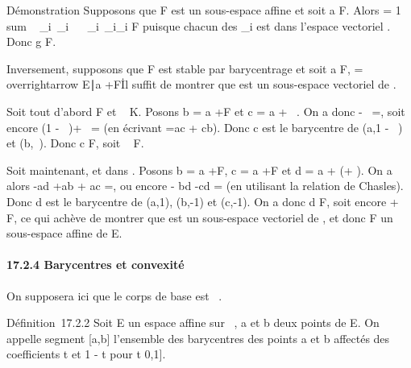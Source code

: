 \documentclass[]{article}
\begin{document}
Démonstration Supposons que F est un sous-espace affine et soit a \in F.
Alors \overrightarrowag = 1 \over
\\sum ~
\_i\inI\lambda~\_i \
\sum ~
\_i\inI\lambda~\_i\overrightarrowaa\_i
\in\overrightarrow F puisque chacun des
\overrightarrowaa\_i est dans l'espace
vectoriel \overrightarrowF. Donc g \in F.

Inversement, supposons que F est stable par barycentrage et soit a \in F,
\overrightarrowF =
\\overrightarrow\xi
\in\overrightarrow E∣a
+\overrightarrow \xi \in F\. Il suffit
de montrer que \overrightarrowF est un sous-espace
vectoriel de \overrightarrowE.

Soit tout d'abord \overrightarrow\xi
\in\overrightarrow F et \lambda~ \in K. Posons b = a
+\overrightarrow \xi \in F et c = a +
\lambda~\overrightarrow\xi. On a donc
\overrightarrowac -
\lambda~\overrightarrowab =, soit encore (1 - \lambda~)\overrightarrowac +
\lambda~\overrightarrowbc = (en écrivant \overrightarrowab
=\overrightarrow ac +\overrightarrow
cb). Donc c est le barycentre de (a,1 - \lambda~) et (b,\lambda~). Donc c \in F, soit
\lambda~\overrightarrow\xi \in\overrightarrow
F.

Soit maintenant, \overrightarrow\xi et
\overrightarrow\eta dans
\overrightarrowF. Posons b = a
+\overrightarrow \xi \in F, c = a
+\overrightarrow \eta \in F et d = a +
(\overrightarrow\xi +\overrightarrow
\eta). On a alors -\overrightarrow ad
+\overrightarrow ab +\overrightarrow
ac =, ou encore
\overrightarrowad -\overrightarrow
bd -\overrightarrow cd
= (en utilisant la relation de
Chasles). Donc d est le barycentre de (a,1), (b,-1) et (c,-1). On a donc
d \in F, soit encore \overrightarrow\xi
+\overrightarrow \eta \in{}, ce qui achève de montrer que \overrightarrowF
est un sous-espace vectoriel de \overrightarrowE, et
donc F un sous-espace affine de E.

\paragraph{17.2.4 Barycentres et convexité}

On supposera ici que le corps de base est ~.

Définition~17.2.2 Soit E un espace affine sur ~, a et b deux points de
E. On appelle segment {[}a,b{]} l'ensemble des barycentres des points a
et b affectés des coefficients t et 1 - t pour t \in {[}0,1{]}.
\end{document}
